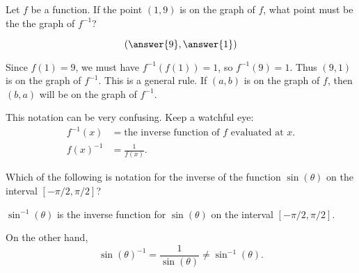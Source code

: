 \documentclass{ximera}
\begin{document}
\begin{question}
  Let $f$ be a function.  If the point $(1,9)$ is on the graph of $f$,
  what point must be the the graph of $f^{-1}$?
  \begin{prompt}
  \[
  \left( \answer{9}, \answer{1} \right)
  \]
  \end{prompt}
  \begin{feedback}
    Since $f(1) = 9$, we must have $f^{-1}(f(1)) = 1$, so $f^{-1}(9) =
    1$.  Thus $(9,1)$ is on the graph of $f^{-1}$.  This is a general
    rule.  If $(a,b)$ is on the graph of $f$, then $(b,a)$ will be on the
    graph of $f^{-1}$.
  \end{feedback}
\end{question}

\begin{warning}
  This notation can be very confusing.  Keep a watchful eye:
  \begin{align*}
    f^{-1}(x) &= \text{the inverse function of $f$ evaluated at $x$.}\\
    f(x)^{-1} &= \text{$\frac{1}{f(x)}$.}
  \end{align*}
\end{warning}
\begin{question}
  Which of the following is notation for the inverse of the function
  $\sin(\theta)$ on the interval $[-\pi/2,\pi/2]$?
  \begin{multipleChoice}
  \end{multipleChoice}
  \begin{feedback}
    $\sin^{-1}(\theta)$ is the inverse function for $\sin(\theta)$ on
    the interval $[-\pi/2,\pi/2]$.

    On the other hand,
    \[
    \sin(\theta)^{-1} = \frac{1}{\sin(\theta)} \ne \sin^{-1}(\theta).
    \]
  \end{feedback}
\end{question}
\end{document}

